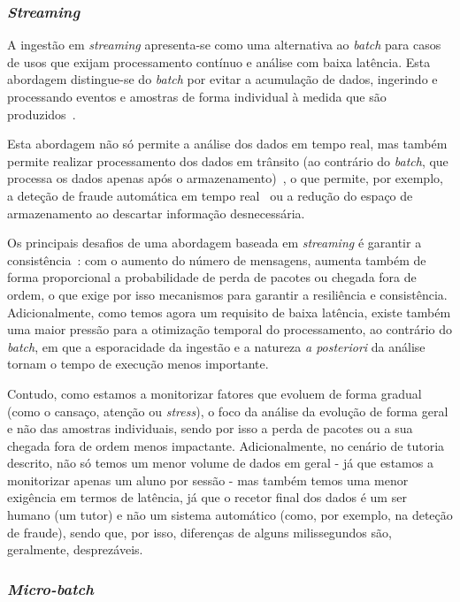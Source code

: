 \subsubsection{\textit{Streaming}}

A ingestão em \textit{streaming} apresenta-se como uma alternativa ao \textit{batch} para casos de usos que exijam processamento contínuo e análise com baixa latência.
Esta abordagem distingue-se do \textit{batch} por evitar a acumulação de dados, ingerindo e processando eventos e amostras de forma individual à medida que são produzidos~\cite{Dendane2019}.

Esta abordagem não só permite a análise dos dados em tempo real, mas também permite realizar processamento dos dados em trânsito (ao contrário do \textit{batch}, que processa os dados apenas após o armazenamento)~\cite{Dendane2019}, o que permite, por exemplo, a deteção de fraude automática em tempo real~\cite{Dendane2019} ou a redução do espaço de armazenamento ao descartar informação desnecessária.

Os principais desafios de uma abordagem baseada em \textit{streaming} é garantir a consistência~\cite{Akidau2018}: com o aumento do número de mensagens, aumenta também de forma proporcional a probabilidade de perda de pacotes ou chegada fora de ordem, o que exige por isso mecanismos para garantir a resiliência e consistência.
Adicionalmente, como temos agora um requisito de baixa latência, existe também uma maior pressão para a otimização temporal do processamento, ao contrário do \textit{batch}, em que a esporacidade da ingestão e a natureza \textit{a posteriori} da análise tornam o tempo de execução menos importante.

Contudo, como estamos a monitorizar fatores que evoluem de forma gradual (como o cansaço, atenção ou \textit{stress}), o foco da análise da evolução de forma geral e não das amostras individuais, sendo por isso a perda de pacotes ou a sua chegada fora de ordem menos impactante.
Adicionalmente, no cenário de tutoria descrito, não só temos um menor volume de dados em geral - já que estamos a monitorizar apenas um aluno por sessão - mas também temos uma menor exigência em termos de latência, já que o recetor final dos dados é um ser humano (um tutor) e não um sistema automático (como, por exemplo, na deteção de fraude), sendo que, por isso, diferenças de alguns milissegundos são, geralmente, desprezáveis.

\subsubsection{\textit{Micro-batch}}

